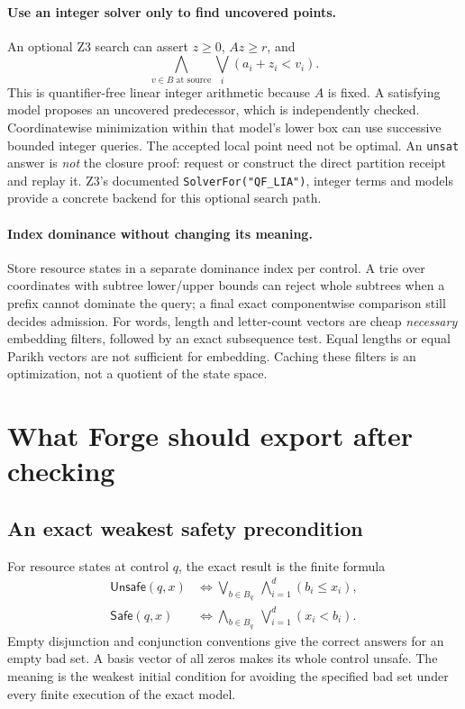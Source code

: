 \documentclass[11pt,a4paper]{article}
\theoremstyle{definition}
\newcommand{\Unsafe}{\mathsf{Unsafe}}
\newcommand{\Safe}{\mathsf{Safe}}
\newcommand{\code}[1]{\texttt{#1}}
\begin{document}
\paragraph{Use an integer solver only to find uncovered points.}
An optional Z3 search can assert $z\geq0$, $Az\geq r$, and
\[
 \bigwedge_{v\in B\text{ at source}}
       \bigvee_i (a_i+z_i<v_i).
\]
This is quantifier-free linear integer arithmetic because $A$ is fixed.
A satisfying model proposes an uncovered predecessor, which is independently
checked. Coordinatewise minimization within that model's lower box can use
successive bounded integer queries. The accepted local point need not be
optimal. An \code{unsat} answer is \emph{not} the closure proof: request or
construct the direct partition receipt and replay it. Z3's documented
\code{SolverFor("QF\_LIA")}, integer terms and models provide a concrete
backend for this optional search path.\cite{z3}

\paragraph{Index dominance without changing its meaning.}
Store resource states in a separate dominance index per control. A trie over
coordinates with subtree lower/upper bounds can reject whole subtrees when
a prefix cannot dominate the query; a final exact componentwise comparison
still decides admission. For words, length and letter-count vectors are cheap
\emph{necessary} embedding filters, followed by an exact subsequence test.
Equal lengths or equal Parikh vectors are not sufficient for embedding.
Caching these filters is an optimization, not a quotient of the state space.

\section{What Forge should export after checking}
\label{sec:output}

\subsection{An exact weakest safety precondition}
For resource states at control $q$, the exact result is the finite formula
\begin{align}
 \Unsafe(q,x)
   &\Longleftrightarrow
     \bigvee_{b\in B_q}\ \bigwedge_{i=1}^{d}(b_i\leq x_i),\\
 \Safe(q,x)
   &\Longleftrightarrow
     \bigwedge_{b\in B_q}\ \bigvee_{i=1}^{d}(x_i<b_i).
 \label{eq:cnf}
\end{align}
Empty disjunction and conjunction conventions give the correct answers for
an empty bad set. A basis vector of all zeros makes its whole control unsafe.
The meaning is the weakest initial condition for avoiding the specified bad
set under every finite execution of the exact model.
\end{document}
